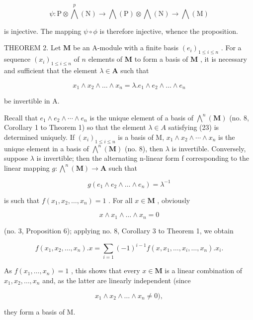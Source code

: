 \[
\psi : \mathrm{P} \otimes \bigwedge^ {p} (\mathrm{N}) \rightarrow \bigwedge (\mathrm{P}) \otimes \bigwedge (\mathrm{N}) \rightarrow \bigwedge (\mathrm{M})
\]

is injective. The mapping \(\psi \circ \phi\) is therefore injective, whence the proposition.

THEOREM 2. Let \(\mathbf{M}\) be an A-module with a finite basis \((e_i)_{1\leqslant i\leqslant n}\) . For a sequence \((x_i)_{1\leqslant i\leqslant n}\) of \(n\) elements of \(\mathbf{M}\) to form a basis of \(\mathbf{M}\) , it is necessary and sufficient that the element \(\lambda \in \mathbf{A}\) such that

\[
x _ {1} \wedge x _ {2} \wedge \dots \wedge x _ {n} = \lambda . e _ {1} \wedge e _ {2} \wedge \dots \wedge e _ {n}\tag{23}
\]

be invertible in A.

Recall that \(e_{1} \wedge e_{2} \wedge \cdots \wedge e_{n}\) is the unique element of a basis of \(\bigwedge^{n}(\mathbf{M})\) (no. 8, Corollary 1 to Theorem 1) so that the element \(\lambda \in A\) satisfying (23) is determined uniquely. If \((x_{i})_{1 \leqslant i \leqslant n}\) is a basis of M, \(x_{1} \wedge x_{2} \wedge \cdots \wedge x_{n}\) is the unique element in a basis of \(\bigwedge^{n}(\mathbf{M})\) (no. 8), then \(\lambda\) is invertible. Conversely, suppose \(\lambda\) is invertible; then the alternating n-linear form f corresponding to the linear mapping \(g: \bigwedge^{n}(\mathbf{M}) \to \mathbf{A}\) such that

\[
g (e _ {1} \wedge e _ {2} \wedge \dots \wedge e _ {n}) = \lambda^ {- 1}
\]

is such that \(f(x_{1}, x_{2}, \ldots, x_{n}) = 1\) . For all \(x \in \mathbf{M}\) , obviously

\[
x \wedge x _ {1} \wedge \dots \wedge x _ {n} = 0
\]

(no. 3, Proposition 6); applying no. 8, Corollary 3 to Theorem 1, we obtain

\[
f (x _ {1}, x _ {2}, \dots , x _ {n}). x = \sum_ {i = 1} (- 1) ^ {i - 1} f (x, x _ {1}, \dots , \hat {x} _ {i}, \dots , x _ {n}). x _ {i}.
\]

As \(f(x_{1},\ldots ,x_{n}) = 1\) , this shows that every \(x\in \mathbf{M}\) is a linear combination of \(x_{1},x_{2},\ldots ,x_{n}\) and, as the latter are linearly independent (since

\[
x _ {1} \wedge x _ {2} \wedge \dots \wedge x _ {n} \neq 0),
\]

they form a basis of M.

